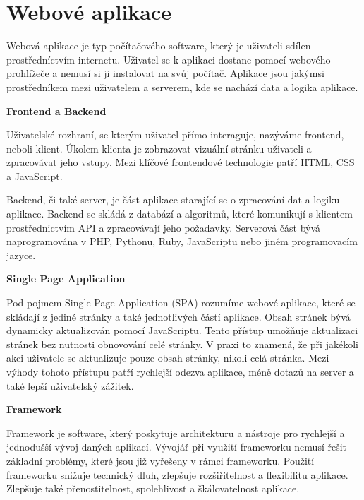 \section{Webové aplikace}

Webová aplikace je typ počítačového software, který je uživateli sdílen prostředníctvím internetu. 
Uživatel se k aplikaci dostane pomocí webového prohlížeče a nemusí si ji instalovat na svůj počítač. 
Aplikace jsou jakýmsi prostředníkem mezi uživatelem a serverem, kde se nachází data a logika aplikace.\cite{codeacademywebapp}

\begin{flushleft}
  \textbf{Frontend a Backend}
\end{flushleft}

Uživatelské rozhraní, se kterým uživatel přímo interaguje, nazýváme frontend, neboli klient.
Úkolem klienta je zobrazovat vizuální stránku uživateli a zpracovávat jeho vstupy. 
Mezi klíčové frontendové technologie patří HTML, CSS a JavaScript.

Backend, či také server, je část aplikace starající se o zpracování dat a logiku aplikace. 
Backend se skládá z databází a algoritmů, které komunikují s klientem prostřednictvím API a zpracovávají jeho požadavky. 
Serverová část bývá naprogramována v PHP, Pythonu, Ruby, JavaScriptu nebo jiném programovacím jazyce.\cite{stateofartframeworks}

\begin{flushleft}
  \textbf{Single Page Application}
\end{flushleft}

Pod pojmem Single Page Application (SPA) rozumíme webové aplikace, které se skládají z jediné stránky a také jednotlivých částí aplikace. 
Obsah stránek bývá dynamicky aktualizován pomocí JavaScriptu. Tento přístup umožňuje aktualizaci stránek bez nutnosti obnovování celé stránky. 
V praxi to znamená, že při jakékoli akci uživatele se aktualizuje pouze obsah stránky, nikoli celá stránka. 
Mezi výhody tohoto přístupu patří rychlejší odezva aplikace, méně dotazů na server a také lepší uživatelský zážitek.\cite{jadhavspa}

\begin{flushleft}
  \textbf{Framework}
\end{flushleft}

Framework je software, který poskytuje architekturu a nástroje pro rychlejší a jednodušší vývoj daných aplikací. 
Vývojář při využití frameworku nemusí řešit základní problémy, které jsou již vyřešeny v rámci frameworku. 
Použití frameworku snižuje technický dluh, zlepšuje rozšiřitelnost a flexibilitu aplikace. 
Zlepšuje také přenostitelnost, spolehlivost a škálovatelnost aplikace.\cite{schmidtframeworks}